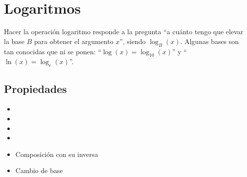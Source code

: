\section{Logaritmos}

Hacer la operación logaritmo responde a la pregunta ``a cuánto tengo que elevar la base $B$ para obtener el argumento $x$'', siendo $\log_B(x)$. Algunas bases son tan conocidas que ni se ponen: ``$\log(x) = \log_{10}(x)$'' y ``$\ln(x) = \log_{e}(x)$''.

\subsection*{Propiedades }
\begin{itemize}
\item {}
\item {}
\item {}
\item {}
\item {}
Composición con su inversa
\item {}
Cambio de base
\end{itemize}


